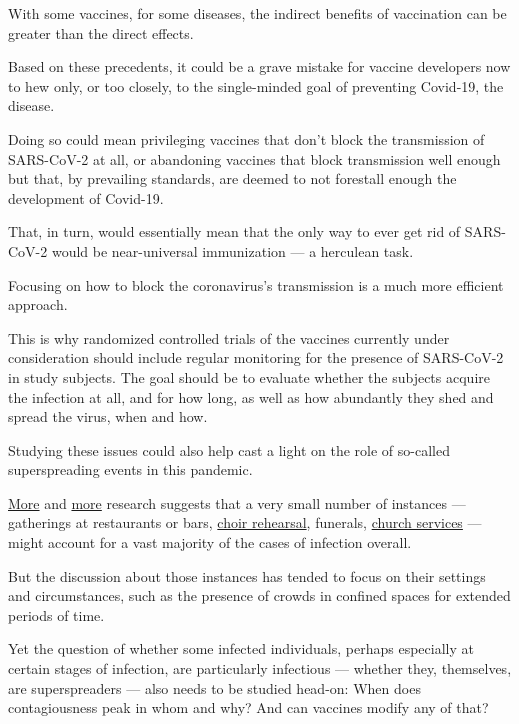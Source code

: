 With some vaccines, for some diseases, the indirect benefits of
vaccination can be greater than the direct effects.

Based on these precedents, it could be a grave mistake for vaccine
developers now to hew only, or too closely, to the single-minded goal of
preventing Covid-19, the disease.

Doing so could mean privileging vaccines that don't block the
transmission of SARS-CoV-2 at all, or abandoning vaccines that block
transmission well enough but that, by prevailing standards, are deemed
to not forestall enough the development of Covid-19.

That, in turn, would essentially mean that the only way to ever get rid
of SARS-CoV-2 would be near-universal immunization --- a herculean task.

Focusing on how to block the coronavirus's transmission is a much more
efficient approach.

This is why randomized controlled trials of the vaccines currently under
consideration should include regular monitoring for the presence of
SARS-CoV-2 in study subjects. The goal should be to evaluate whether the
subjects acquire the infection at all, and for how long, as well as how
abundantly they shed and spread the virus, when and how.

Studying these issues could also help cast a light on the role of
so-called superspreading events in this pandemic.

\href{https://www.scientificamerican.com/article/how-superspreading-events-drive-most-covid-19-spread1/}{More}
and
\href{https://www.nytimes3xbfgragh.onion/2020/08/07/health/coronavirus-superspreading-contagion.html}{more}
research suggests that a very small number of instances --- gatherings
at restaurants or bars,
\href{https://www.nytimes3xbfgragh.onion/2020/05/12/health/coronavirus-choir.html}{choir
rehearsal}, funerals,
\href{https://www.bbc.com/news/world-asia-53620633}{church services} ---
might account for a vast majority of the cases of infection overall.

But the discussion about those instances has tended to focus on their
settings and circumstances, such as the presence of crowds in confined
spaces for extended periods of time.

Yet the question of whether some infected individuals, perhaps
especially at certain stages of infection, are particularly infectious
--- whether they, themselves, are superspreaders --- also needs to be
studied head-on: When does contagiousness peak in whom and why? And can
vaccines modify any of that?


